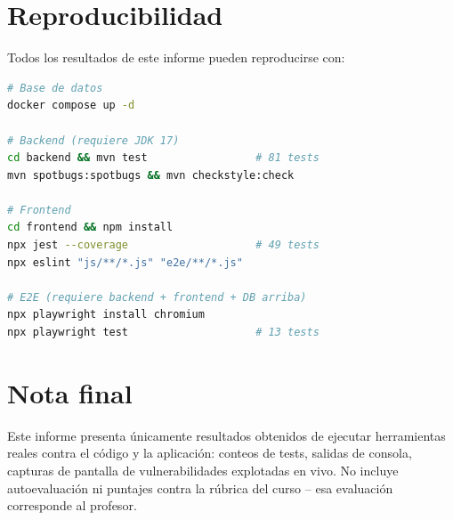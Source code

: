 \documentclass[11pt,a4paper]{article}
\begin{document}
\section{Reproducibilidad}

Todos los resultados de este informe pueden reproducirse con:

\begin{lstlisting}[language=bash]
# Base de datos
docker compose up -d

# Backend (requiere JDK 17)
cd backend && mvn test                 # 81 tests
mvn spotbugs:spotbugs && mvn checkstyle:check

# Frontend
cd frontend && npm install
npx jest --coverage                    # 49 tests
npx eslint "js/**/*.js" "e2e/**/*.js"

# E2E (requiere backend + frontend + DB arriba)
npx playwright install chromium
npx playwright test                    # 13 tests
\end{lstlisting}

\section*{Nota final}

Este informe presenta \'unicamente resultados obtenidos de ejecutar
herramientas reales contra el c\'odigo y la aplicaci\'on: conteos de tests,
salidas de consola, capturas de pantalla de vulnerabilidades explotadas en
vivo. No incluye autoevaluaci\'on ni puntajes contra la r\'ubrica del curso
-- esa evaluaci\'on corresponde al profesor.
\end{document}
